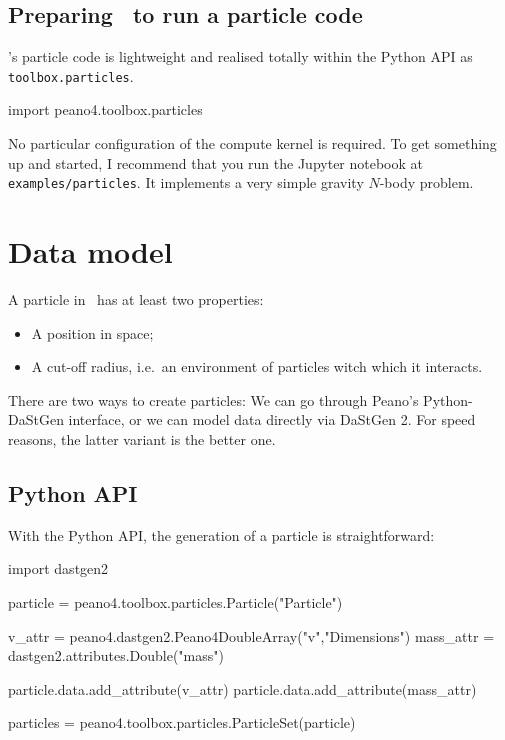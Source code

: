\subsection*{Preparing \Peano\ to run a particle code}

\Peano's particle code is lightweight and realised totally within the Python
API as \texttt{toolbox.particles}.

\begin{code}
import peano4.toolbox.particles
\end{code}

No particular configuration of the compute kernel is required.
To get something up and started, I recommend that you run the Jupyter notebook
at \texttt{examples/particles}.
It implements a very simple gravity $N$-body problem.


\section{Data model}

A particle in \Peano\ has at least two properties:

\begin{itemize}
  \item A position in space;
  \item A cut-off radius, i.e.~an environment of particles witch which it
  interacts.
\end{itemize}

\noindent
There are two ways to create particles: 
We can go through Peano's Python-DaStGen interface, or we can model data
directly via DaStGen 2.
For speed reasons, the latter variant is the better one.

\subsection{Python API}

With the Python API, the generation of a particle is straightforward:

\begin{code}
import dastgen2


particle = peano4.toolbox.particles.Particle("Particle")

v_attr = peano4.dastgen2.Peano4DoubleArray("v","Dimensions")
mass_attr = dastgen2.attributes.Double("mass")

particle.data.add_attribute(v_attr)
particle.data.add_attribute(mass_attr)

particles = peano4.toolbox.particles.ParticleSet(particle)
\end{code}



